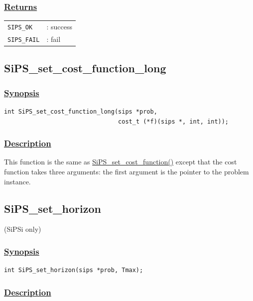 \documentclass[a4paper]{book}
\begin{document}
\subsubsection{\underline{Returns}}

\begin{tabular}{ll}
  \verb+SIPS_OK+  &: success\\
  \verb+SIPS_FAIL+&: fail\\
\end{tabular}

\hypertarget{SiPS_set_cost_function_long}{%
\subsection{SiPS\_set\_cost\_function\_long}
}

\subsubsection{\underline{Synopsis}}

\begin{verbatim}
int SiPS_set_cost_function_long(sips *prob,
                                cost_t (*f)(sips *, int, int));
\end{verbatim}

\subsubsection{\underline{Description}}

This function is the same as \hyperlink{SiPS_set_cost_function}{SiPS\_set\_cost\_function()} except that the cost function takes three arguments: the first argument is the pointer to the problem instance.

\hypertarget{SiPS_set_horizon}{%
\subsection{SiPS\_set\_horizon}
}

(SiPSi only)

\subsubsection{\underline{Synopsis}}

\begin{verbatim}
int SiPS_set_horizon(sips *prob, Tmax);
\end{verbatim}

\subsubsection{\underline{Description}}
\end{document}
